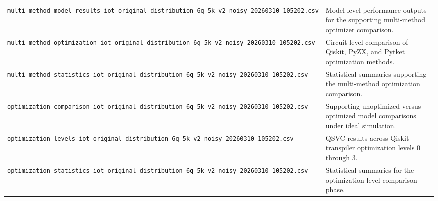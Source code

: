 \documentclass{ieeeaccess}
\begin{document}
\begin{table}[t]
{\begin{tabular}{|l|p{}|}
\texttt{multi\_method\_model\_results\_iot\_original\_distribution\_6q\_5k\_v2\_noisy\_20260310\_105202.csv} & Model-level performance outputs for the supporting multi-method optimizer comparison. \\
\texttt{multi\_method\_optimization\_iot\_original\_distribution\_6q\_5k\_v2\_noisy\_20260310\_105202.csv} & Circuit-level comparison of Qiskit, PyZX, and Pytket optimization methods. \\
\texttt{multi\_method\_statistics\_iot\_original\_distribution\_6q\_5k\_v2\_noisy\_20260310\_105202.csv} & Statistical summaries supporting the multi-method optimization comparison. \\
\texttt{optimization\_comparison\_iot\_original\_distribution\_6q\_5k\_v2\_noisy\_20260310\_105202.csv} & Supporting unoptimized-versus-optimized model comparisons under ideal simulation. \\
\texttt{optimization\_levels\_iot\_original\_distribution\_6q\_5k\_v2\_noisy\_20260310\_105202.csv} & QSVC results across Qiskit transpiler optimization levels 0 through 3. \\
\texttt{optimization\_statistics\_iot\_original\_distribution\_6q\_5k\_v2\_noisy\_20260310\_105202.csv} & Statistical summaries for the optimization-level comparison phase. \\
\hline
\end{tabular}%
}
\end{table}
\end{document}
